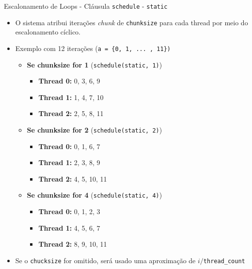 	
	\begin{frame}{Escalonamento de Loops - Cláusula {\tt schedule} - {\tt static}}
		\begin{itemize}
			\item O sistema atribui iterações \textit{chunk} de {\tt chunksize} para cada thread por meio do escalonamento cíclico.
					\bigskip
			\item Exemplo com 12 iterações ({\tt a = \{0, 1, ... , 11\})}
					\pause
			\begin{itemize}
				\setlength\itemsep{0.5em}
				\item \textbf{Se chunksize for 1} ({\tt schedule(static, 1)})
				\begin{itemize}
					\setlength\itemsep{0.3em}
					\item \textbf{Thread 0:} 0, 3, 6, 9
					\item \textbf{Thread 1:} 1, 4, 7, 10
					\item \textbf{Thread 2:} 2, 5, 8, 11
				\end{itemize}
						\pause
				\item \textbf{Se chunksize for 2} ({\tt schedule(static, 2)})
				\begin{itemize}
					\setlength\itemsep{0.3em}
					\item \textbf{Thread 0:} 0, 1, 6, 7
					\item \textbf{Thread 1:} 2, 3, 8, 9
					\item \textbf{Thread 2:} 4, 5, 10, 11
				\end{itemize}
						\pause 
				\item \textbf{Se chunksize for 4} ({\tt schedule(static, 4)})
				\begin{itemize}
					\setlength\itemsep{0.3em}
					\item \textbf{Thread 0:} 0, 1, 2, 3
					\item \textbf{Thread 1:} 4, 5, 6, 7
					\item \textbf{Thread 2:} 8, 9, 10, 11
				\end{itemize}
			\end{itemize}
			\item Se o {\tt chucksize} for omitido, será usado uma aproximação de $i/${\tt thread\_count}
		\end{itemize}
	\end{frame}

